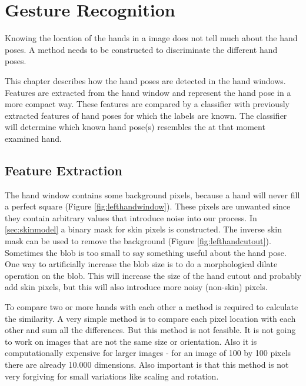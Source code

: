 
\chapter{Gesture Recognition}
\label{ch:gestures}

Knowing the location of the hands in a image does not tell much about the hand poses. A method needs to be constructed to discriminate the different hand poses.

This chapter describes how the hand poses are detected in the hand windows. Features are extracted from the hand window and represent the hand pose in a more compact way. These features are compared by a classifier with previously extracted features of hand poses for which the labels are known. The classifier will determine which known hand pose(s) resembles the at that moment examined hand.


\section{Feature Extraction}
The hand window contains some background pixels, because a hand will never fill a perfect square (Figure \autoref{fig:lefthandwindow}). These pixels are unwanted since they contain arbitrary values that introduce noise into our process. In \autoref{sec:skinmodel} a binary mask for skin pixels is constructed. The inverse skin mask can be used  to remove the background (Figure \autoref{fig:lefthandcutout}). Sometimes the blob is too small to say something useful about the hand pose. One way to artificially increase the blob size is to do a morphological dilate operation on the blob. This will increase the size of the hand cutout and probably add skin pixels, but this will also introduce more noisy (non-skin) pixels.

To compare two or more hands with each other a method is required to calculate the similarity. A very simple method is to compare each pixel location with each other and sum all the differences. But this method is not feasible. It is not going to work on images that are not the same size or orientation. Also it is computationally expensive for larger images - for an image of 100 by 100 pixels there are already 10.000 dimensions. Also important is that this method is not very forgiving for small variations like scaling and rotation.


